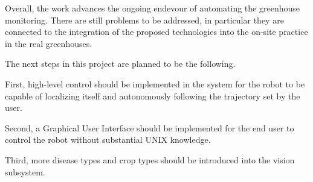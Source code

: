 Overall, the work advances the ongoing endevour of automating the greenhouse monitoring.
There are still problems to be addressed, in particular they are connected to the integration of the proposed technologies into the on-site practice in the real greenhouses.

The next steps in this project are planned to be the following.


First, high-level control should be implemented in the system for the robot to be capable of localizing itself and autonomously following the trajectory set by the user.

Second, a Graphical User Interface should be implemented for the end user to control the robot without substantial UNIX knowledge.

Third, more disease types and crop types should be introduced into the vision subsystem.